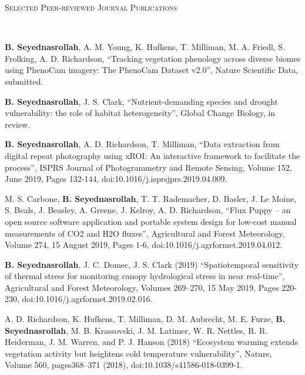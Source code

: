 \documentclass[10pt]{article}
\newenvironment{changemargin}[2]{%
  \begin{list}{}{%
    \setlength{\topsep}{0pt}%
    \setlength{\leftmargin}{#1}%
    \setlength{\rightmargin}{#2}%
    \setlength{\listparindent}{\parindent}%
    \setlength{\itemindent}{\parindent}%
    \setlength{\parsep}{\parskip}%
  }%
  \item[]}{\end{list}
}
\newcommand{\lineover}{
	\begin{changemargin}{-0.05in}{-0.05in}
		\vspace*{-8pt}
		\hrulefill \\
		\vspace*{-2pt}
	\end{changemargin}
}
\newcommand{\header}[1]{
	\begin{changemargin}{-0.5in}{-0.5in}
		\scshape{#1}\\
  	\lineover
	\end{changemargin}
}
\newenvironment{body} {
	\vspace*{-2pt}
	\begin{changemargin}{-0.5in}{-0.5in}
  }
	{\end{changemargin}
}
\begin{document}
\medskip
\header{Selected Peer-reviewed Journal Publications}

\begin{body}
\medskip


\textbf{B. Seyednasrollah}, A. M. Young, K. Hufkens, T. Milliman, M. A. Friedl, S. Frolking, A. D. Richardson, ``Tracking vegetation phenology across diverse biomes using PhenoCam imagery: The PhenoCam Dataset v2.0'', Nature Scientific Data, submitted.\\
\medskip

	\textbf{B. Seyednasrollah}, J. S. Clark, ``Nutrient-demanding species and drought vulnerability: the role of habitat heterogeneity'', Global Change Biology, in review.\\
\medskip

	\textbf{B. Seyednasrollah}, A. D. Richardson, T. Milliman, ``Data extraction from digital repeat photography using xROI: An interactive framework to facilitate the process'', ISPRS Journal of Photogrammetry and Remote Sensing, Volume 152, June 2019, Pages 132-144, doi:10.1016/j.isprsjprs.2019.04.009.\\
\medskip

M. S. Carbone, \textbf{B. Seyednasrollah}, T. T. Rademacher, D. Basler, J. Le Moine, S. Beals, J. Beasley, A. Greene, J. Kelroy, A. D. Richardson, ``Flux Puppy – an open source software application and portable system design for low-cost manual measurements of CO2 and H2O fluxes'', Agricultural and Forest Meteorology, Volume 274, 15 August 2019, Pages 1-6, doi:10.1016/j.agrformet.2019.04.012.\\
\medskip


	\textbf{B. Seyednasrollah}, J. C. Domec, J. S. Clark (2019) ``Spatiotemporal sensitivity of thermal stress for monitoring canopy hydrological stress in near real-time'', Agricultural and Forest Meteorology, Volumes 269–270, 15 May 2019, Pages 220-230, doi:10.1016/j.agrformet.2019.02.016.\\
\medskip

	A. D. Richardson, K. Hufkens, T. Milliman, D. M. Aubrecht, M. E. Furze, \textbf{B. Seyednasrollah}, M. B. Krassovski, J. M. Latimer, W. R. Nettles, R. R. Heiderman, J. M. Warren, and P. J. Hanson (2018) ``Ecosystem warming extends vegetation activity but heightens cold temperature vulnerability'', Nature, Volume 560, pages368–371 (2018), doi:10.1038/s41586-018-0399-1.\\
\medskip


\end{body}
\end{document}
